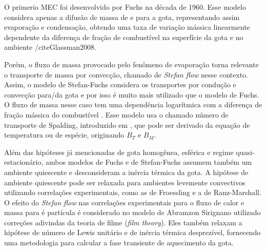 
O primerio MEC foi desenvolvido por Fuchs \cite{Fuchs1959} na década de 1960. 
Esse modelo considera apenas a difusão de massa de e para a gota, representando assim evaporação e condensação, obtendo uma taxa de variação mássica linearmente dependente da diferença de fração de combustível na superfície da gota e no ambiente /cite{Glassman2008}.

Porém, o fluxo de massa provocado pelo fenômeno de evaporação torna relevante o transporte de massa por convecção, chamado de \emph{Stefan flow} nesse contexto. 
Assim, o modelo de Stefan-Fuchs considera os transportes por condução e convecção para/da gota e por isso é muito mais utilizado que o modelo de Fuchs.
O fluxo de massa nesse caso tem uma dependência logarítmica com a diferença de fração mássica do combustível \cite{Glassman2008, Turns2000}.
Esse modelo usa o chamado número de transporte de Spalding, introduzido em \cite{Law1978}, que pode ser derivado da equação de temperatura ou de espécie, originando $B_T$ e $B_M$.

Além das hipóteses já mencionadas de gota homogênea, esférica e regime quasi-estacionário, ambos modelos de Fuchs e de Stefan-Fuchs assumem também um ambiente quiescente e desconsideram a inércia térmica da gota.
A hipótese de ambiente quiescente pode ser relaxada para ambientes levemente convectivos utilizando correlações experimentais, como as de Froessling e a de Ranz-Marshall. 
O efeito do \emph{Stefan flow} nas correlações experimentais para o fluxo de calor e massa para é partícula é considerado no modelo de Abramzon Sirignano \cite{Sirignano1989} utilizado correções adivindas da teoria de filme (\emph{film theory}).
Eles também relaxam a hipótese de número de Lewis unitário e de inércia térmica desprezível, fornecendo uma metodologia para calcular a fase transiente de aquecimento da gota.



